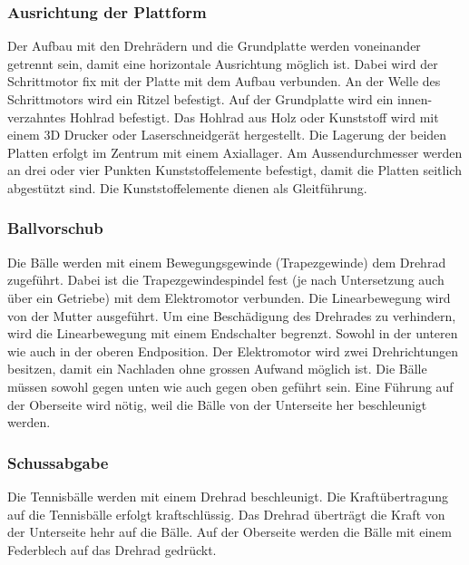 \subsubsection{Ausrichtung der Plattform}
Der Aufbau mit den Drehrädern und die Grundplatte werden voneinander getrennt sein, damit eine horizontale Ausrichtung möglich ist. Dabei wird der Schrittmotor fix mit der Platte mit dem Aufbau verbunden. An der Welle des Schrittmotors wird ein Ritzel befestigt. Auf der Grundplatte wird ein innen-verzahntes Hohlrad befestigt. Das Hohlrad aus Holz oder Kunststoff wird mit einem 3D Drucker oder Laserschneidgerät hergestellt. Die Lagerung der beiden Platten erfolgt im Zentrum mit einem Axiallager. Am Aussendurchmesser werden an drei oder vier Punkten Kunststoffelemente befestigt, damit die Platten seitlich abgestützt sind. Die Kunststoffelemente dienen als Gleitführung.

\subsubsection{Ballvorschub}
Die Bälle werden mit einem Bewegungsgewinde (Trapezgewinde) dem Drehrad zugeführt. Dabei ist die Trapezgewindespindel fest (je nach Untersetzung auch über ein Getriebe) mit dem Elektromotor verbunden. Die Linearbewegung wird von der Mutter ausgeführt. Um eine Beschädigung des Drehrades zu verhindern, wird die Linearbewegung mit einem Endschalter begrenzt. Sowohl in der unteren wie auch in der oberen Endposition. Der Elektromotor wird zwei Drehrichtungen besitzen, damit ein Nachladen ohne grossen Aufwand möglich ist. Die Bälle müssen sowohl gegen unten wie auch gegen oben geführt sein. Eine Führung auf der Oberseite wird nötig, weil die Bälle von der Unterseite her beschleunigt werden.

\subsubsection{Schussabgabe}
Die Tennisbälle werden mit einem Drehrad beschleunigt. Die Kraftübertragung auf die Tennisbälle erfolgt kraftschlüssig. Das Drehrad überträgt die Kraft von der Unterseite hehr auf die Bälle. Auf der Oberseite werden die Bälle mit einem Federblech auf das Drehrad gedrückt.